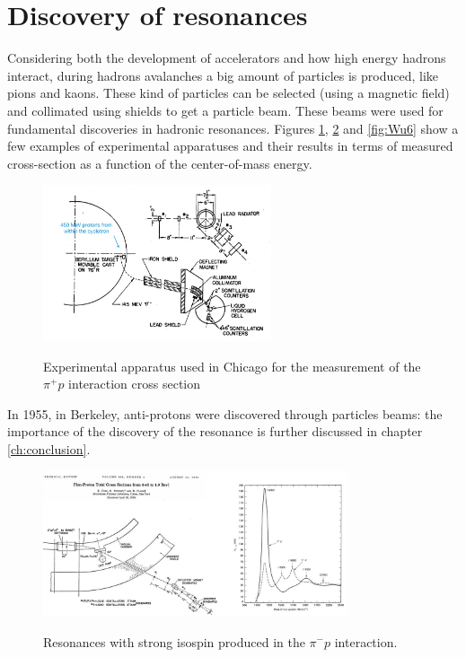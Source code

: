 \section{Discovery of resonances}

Considering both the development of accelerators and how high energy hadrons interact, during hadrons avalanches a big amount of particles is produced, like pions and kaons. 
These kind of particles can be selected (using a magnetic field) and collimated using shields to get a particle beam. These beams were used for fundamental discoveries in hadronic resonances. Figures \ref{fig:Wu4}, \ref{fig:Wu5} and \ref{fig:Wu6} show a few examples of experimental apparatuses and their results in terms of measured cross-section as a function of the center-of-mass energy.

\begin{figure}[!h]
    \centering
    \includegraphics[width=0.6\textwidth]{Figures/FNSN31_5.JPG}
    \label{fig:Wu4}
    \caption{Experimental apparatus used in Chicago for the measurement of the $\pi^+p$ interaction cross section}
\end{figure} 

In 1955, in Berkeley, anti-protons were discovered  through particles beams: the importance of the discovery of the resonance is further discussed in chapter \ref{ch:conclusion}. 

\begin{figure}[h]
    \centering
    \includegraphics[width=0.8\textwidth]{Figures/FNSN31_6.JPG}
    \label{fig:Wu5}
    \caption{Resonances with strong isospin produced in the $\pi^- p$ interaction.}
\end{figure} 

